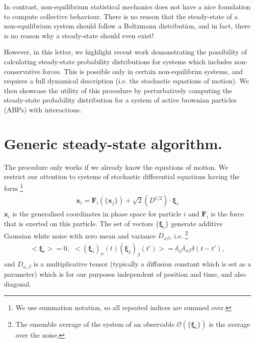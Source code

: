 \documentclass[twocolumn,amsmath,amssymb,aps]{revtex4-1}%
\begin{document}
In contrast, non-equilibrium statistical mechanics does not have a nice
foundation to compute collective behaviour. There is no reason that the
steady-state of a non-equilibrium system should follow a Boltzmann
distribution, and in fact, there is no reason why a steady-state should even
exist!

However, in this letter, we highlight recent work demonstrating the
possibility of calculating steady-state probability distributions for
systems which includes non-conservative forces. This is possible only
in certain non-equilibrim systems, and requires a full dynamical
description (i.e. the stochastic equations of motion). We then showcase
the utility of this procedure by perturbatively computing the
steady-state probability distribution for a system of active brownian
particles (ABPs) with interactions.



\section{Generic steady-state algorithm.}
The procedure only works if we already know the equations of motion.
We restrict our attention to
systems of stochastic differential equations having the form
\footnote{We use summation notation, so all repeated indices are summed
  over.}
\begin{align}\label{eq:stochasticEOMs}
  \dot{\bm{x}}_i = \bm{F}_i(\{\bm{x}_j\})+\sqrt{2}(D^{1/2})\cdot\bm{\xi}_i
\end{align}
$\bm{x}_i$ is the generalised coordinates in phase space for particle
$i$ and $\bm{F}_i$ is the force that is exerted on this particle.
The set of vectors $\{\bm{\xi}_i\}$ generate additive Gaussian white
noise with zero mean and variance $D_{\alpha\beta}$, i.e.
\footnote{The ensemble average of the system of an observable
  $\mathcal{O}(\{\bm{\xi}_i\})$ is the average over the noise,
}
\begin{align}
  <\bm{\xi}_i>=0,\:\:<(\bm{\xi}_i)_{\alpha}(t)(\bm{\xi}_j)_{\beta}(t')>
  =\delta_{ij}\delta_{\alpha\beta}\delta(t-t'),
\end{align}
and $D_{\alpha,\beta}$ is a multiplicative tensor (typically a diffusion
constant which is set as a parameter) which is for our purposes independent
of position and time, and also diagonal.
\end{document}
